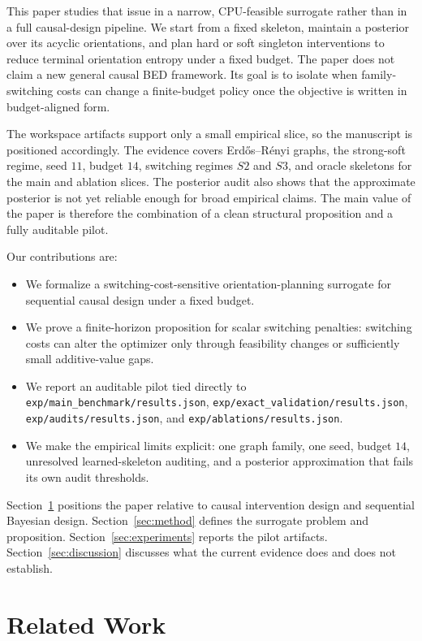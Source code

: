\documentclass[10pt]{article}
\begin{document}
This paper studies that issue in a narrow, CPU-feasible surrogate rather than in a full causal-design pipeline. We start from a fixed skeleton, maintain a posterior over its acyclic orientations, and plan hard or soft singleton interventions to reduce terminal orientation entropy under a fixed budget. The paper does not claim a new general causal BED framework. Its goal is to isolate when family-switching costs can change a finite-budget policy once the objective is written in budget-aligned form.

The workspace artifacts support only a small empirical slice, so the manuscript is positioned accordingly. The evidence covers Erd\H{o}s--R\'enyi graphs, the strong-soft regime, seed $11$, budget $14$, switching regimes $S2$ and $S3$, and oracle skeletons for the main and ablation slices. The posterior audit also shows that the approximate posterior is not yet reliable enough for broad empirical claims. The main value of the paper is therefore the combination of a clean structural proposition and a fully auditable pilot.

Our contributions are:
\begin{itemize}[leftmargin=1.1em]
  \item We formalize a switching-cost-sensitive orientation-planning surrogate for sequential causal design under a fixed budget.
  \item We prove a finite-horizon proposition for scalar switching penalties: switching costs can alter the optimizer only through feasibility changes or sufficiently small additive-value gaps.
  \item We report an auditable pilot tied directly to \texttt{exp/main\_benchmark/results.json}, \texttt{exp/exact\_validation/results.json}, \texttt{exp/audits/results.json}, and \texttt{exp/ablations/results.json}.
  \item We make the empirical limits explicit: one graph family, one seed, budget $14$, unresolved learned-skeleton auditing, and a posterior approximation that fails its own audit thresholds.
\end{itemize}

Section~\ref{sec:related} positions the paper relative to causal intervention design and sequential Bayesian design. Section~\ref{sec:method} defines the surrogate problem and proposition. Section~\ref{sec:experiments} reports the pilot artifacts. Section~\ref{sec:discussion} discusses what the current evidence does and does not establish.

\section{Related Work}
\label{sec:related}
\end{document}
